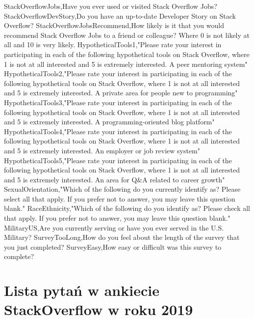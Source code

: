 \begin{appendices}
StackOverflowJobs,Have you ever used or visited Stack Overflow Jobs?
StackOverflowDevStory,Do you have an up-to-date Developer Story on Stack Overflow?
StackOverflowJobsRecommend,How likely is it that you would recommend Stack Overflow Jobs to a friend or colleague? Where 0 is not likely at all and 10 is very likely.
HypotheticalTools1,"Please rate your interest in participating in each of the following hypothetical tools on Stack Overflow, where 1 is not at all interested and 5 is extremely interested. A peer mentoring system"
HypotheticalTools2,"Please rate your interest in participating in each of the following hypothetical tools on Stack Overflow, where 1 is not at all interested and 5 is extremely interested. A private area for people new to programming"
HypotheticalTools3,"Please rate your interest in participating in each of the following hypothetical tools on Stack Overflow, where 1 is not at all interested and 5 is extremely interested. A programming-oriented blog platform"
HypotheticalTools4,"Please rate your interest in participating in each of the following hypothetical tools on Stack Overflow, where 1 is not at all interested and 5 is extremely interested. An employer or job review system"
HypotheticalTools5,"Please rate your interest in participating in each of the following hypothetical tools on Stack Overflow, where 1 is not at all interested and 5 is extremely interested. An area for Q&A related to career growth"
SexualOrientation,"Which of the following do you currently identify as? Please select all that apply. If you prefer not to answer, you may leave this question blank."
RaceEthnicity,"Which of the following do you identify as? Please check all that apply. If you prefer not to answer, you may leave this question blank."
MilitaryUS,Are you currently serving or have you ever served in the U.S. Military?
SurveyTooLong,How do you feel about the length of the survey that you just completed?
SurveyEasy,How easy or difficult was this survey to complete?

\chapter{Lista pytań w ankiecie StackOverflow w roku 2019}\label{app:dod3}
\end{appendices}
\thispagestyle{normal}
